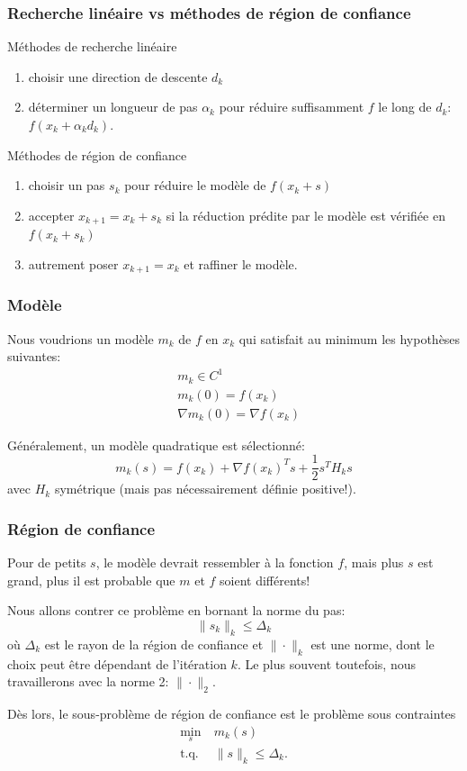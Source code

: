 \documentclass[t,usepdftitle=false]{beamer}
\def\red{\color{red}}
\begin{document}
\begin{frame}
\frametitle{Recherche linéaire vs méthodes de région de confiance}

{\red Méthodes de recherche linéaire}
\begin{enumerate}
\item
choisir une direction de descente $d_k$
\item
déterminer un longueur de pas $\alpha_k$ pour réduire suffisamment $f$ le long de $d_k$: $f(x_k + \alpha_k d_k)$.
\end{enumerate}

\mbox{}

{\red Méthodes de région de confiance}
\begin{enumerate}
\item
choisir un pas $s_k$ pour réduire le modèle de $f(x_k+s)$
\item
accepter $x_{k+1} = x_k + s_k$ si la réduction prédite par le modèle est vérifiée en $f(x_k + s_k)$
\item
autrement poser $x_{k+1} = x_k$ et raffiner le modèle.
\end{enumerate}

\end{frame}

\begin{frame}
\frametitle{Modèle}

Nous voudrions un modèle $m_k$ de $f$ en $x_k$ qui satisfait au minimum les hypothèses suivantes:
\begin{align*}
& m_k \in C^1 \\
& m_k(0) = f(x_k) \\
& \nabla m_k(0) = \nabla f(x_k)
\end{align*}

\mbox{}

Généralement, un modèle quadratique est sélectionné:
$$
m_k(s) = f(x_k) + \nabla f(x_k)^Ts + \frac{1}{2}s^TH_ks
$$
avec $H_k$ symétrique (mais pas nécessairement définie positive!).

\end{frame}

\begin{frame}
\frametitle{Région de confiance}

Pour de petits $s$, le modèle devrait ressembler à la fonction $f$, mais plus $s$ est grand, plus il est probable que $m$ et $f$ soient différents!

\mbox{}

Nous allons contrer ce problème en bornant la norme du pas:
$$
\| s_k \|_k \leq \Delta_k
$$
où $\Delta_k$ est le {\red rayon de la région de confiance} et $\| \cdot \|_k$ est une norme, dont le choix peut être dépendant de l'itération $k$.
Le plus souvent toutefois, nous travaillerons avec la norme 2: $\| \cdot \|_2$.

\mbox{}

Dès lors, le sous-problème de région de confiance est le problème sous contraintes
\begin{align*}
\min_s \ & m_k(s) \\
\mbox{t.q. } & \| s \|_k \leq \Delta_k.
\end{align*}

\end{frame}
\end{document}
